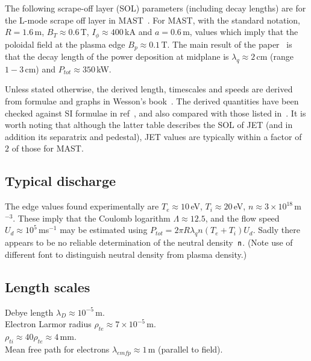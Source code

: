 The following scrape-off layer (SOL) parameters (including decay lengths) are for the
L-mode scrape off layer in MAST~\cite{Mi13Expe}.
For MAST,  with the standard notation,
$R=1.6$\,m, $B_T \approx 0.6$\,T, $I_\phi \approx 400$\,kA and
$a=0.6$\,m, values which imply that the poloidal field at the
plasma edge $B_p \approx 0.1$\,T.
The main result of the paper~\cite{Mi13Expe} is that the decay length of the power
deposition at midplane is $\lambda_q \approx 2$\,cm (range $1-3$\,cm)
and $P_{tot} \approx 350$\,kW.

Unless stated otherwise, the derived length, timescales and speeds are derived from
formulae and graphs in Wesson's book~\cite[Chap 10]{wesson}.
The derived quantities have been checked against SI formulae
in ref~\cite[Table 2.2]{miyamoto}, and also compared with those
listed in~\cite[Appendix]{Xu10Inte}. It is worth noting that although
the latter table describes the SOL of JET (and in addition its separatrix and pedestal),
JET values are typically within a factor of~$2$ of those for MAST.

\subsection{Typical discharge}

The edge values found experimentally are 
$T_e \approx 10$\,eV, $T_i \approx 20$\,eV, $n \approx 3 \times 10^{18}$\,m$^{-3}$.
These imply that the Coulomb logarithm $\Lambda \approx 12.5$, and
the flow speed~$U_d \approx 10^5$\,ms$^{-1}$ may be estimated using
$P_{tot}= 2 \pi R \lambda_q n (T_e+T_i) U_d$.
Sadly there appears to be no reliable determination of the neutral density~${\sf n}$.
(Note use of different font to distinguish neutral density from plasma density.)

\subsection{Length scales}

Debye length $\lambda_D \approx 10^{-5}$\,m. \\
Electron Larmor radius $\rho_{te} \approx 7 \times 10^{-5}$\,m. \\
$\rho_{ti} \approx 40 \rho_{te} \approx 4$\,mm. \\
Mean free path for electrons $\lambda_{emfp} \approx 1$\,m (parallel to field).

